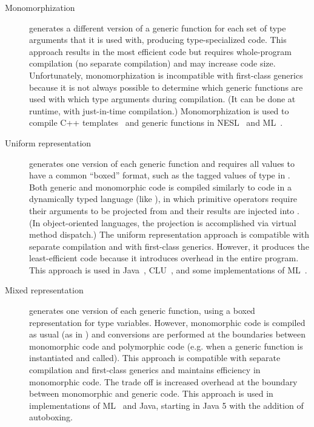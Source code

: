 \documentclass[7x10]{TimesAPriori_MIT}%
\numberwithin{theorem}{chapter}
\numberwithin{definition}{chapter}
\numberwithin{equation}{chapter}
\begin{document}
\begin{description}
\item[Monomorphization] generates a different version of a generic
  function for each set of type arguments that it is used with,
  producing type-specialized code. This approach results in the most
  efficient code but requires whole-program compilation (no separate
  compilation) and may increase code size.  Unfortunately,
  monomorphization is incompatible with first-class generics
  because it is not always possible to determine which generic
  functions are used with which type arguments during compilation. (It
  can be done at runtime, with just-in-time compilation.)
  Monomorphization is used to compile C++
  templates~\citep{stroustrup88:_param_types} and generic functions in
  NESL~\citep{Blelloch:1993aa} and ML~\citep{Weeks:2006aa}.
  
\item[Uniform representation] generates one version of each generic
  function and requires all values to have a common ``boxed'' format,
  such as the tagged values of type \CANYTY{} in \LangAny{}. Both
  generic and monomorphic code is compiled similarly to code in a
  dynamically typed language (like \LangDyn{}), in which primitive
  operators require their arguments to be projected from \CANYTY{} and
  their results are injected into \CANYTY{}.  (In object-oriented
  languages, the projection is accomplished via virtual method
  dispatch.) The uniform representation approach is compatible with
  separate compilation and with first-class generics.  However, it
  produces the least-efficient code because it introduces overhead in
  the entire program. This approach is used in
  Java~\citep{Bracha:1998fk},
  CLU~\cite{liskov79:_clu_ref,Liskov:1993dk}, and some implementations
  of ML~\citep{Cardelli:1984aa,Appel:1987aa}.
  
\item[Mixed representation] generates one version of each generic
  function, using a boxed representation for type variables. However,
  monomorphic code is compiled as usual (as in \LangLam{}) and
  conversions are performed at the boundaries between monomorphic code
  and polymorphic code (e.g. when a generic function is instantiated
  and called). This approach is compatible with separate compilation
  and first-class generics and maintains efficiency in monomorphic
  code. The trade off is increased overhead at the boundary between
  monomorphic and generic code.  This approach is used in
  implementations of ML~\citep{Leroy:1992qb} and Java, starting in
  Java 5 with the addition of autoboxing.
  

\end{description}
\end{document}
